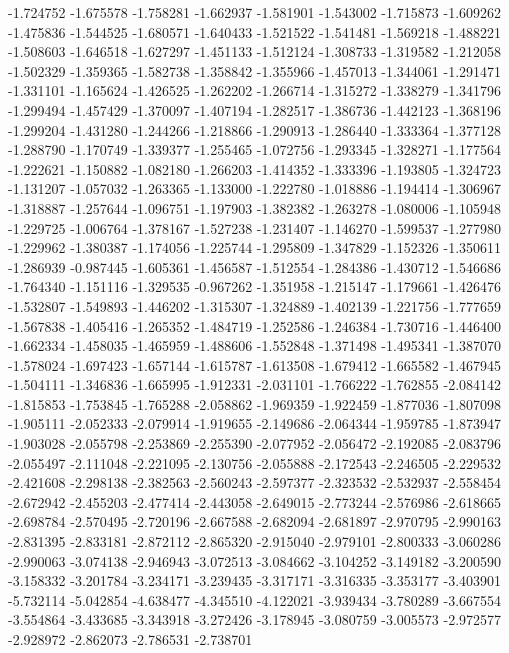 -1.724752
-1.675578
-1.758281
-1.662937
-1.581901
-1.543002
-1.715873
-1.609262
-1.475836
-1.544525
-1.680571
-1.640433
-1.521522
-1.541481
-1.569218
-1.488221
-1.508603
-1.646518
-1.627297
-1.451133
-1.512124
-1.308733
-1.319582
-1.212058
-1.502329
-1.359365
-1.582738
-1.358842
-1.355966
-1.457013
-1.344061
-1.291471
-1.331101
-1.165624
-1.426525
-1.262202
-1.266714
-1.315272
-1.338279
-1.341796
-1.299494
-1.457429
-1.370097
-1.407194
-1.282517
-1.386736
-1.442123
-1.368196
-1.299204
-1.431280
-1.244266
-1.218866
-1.290913
-1.286440
-1.333364
-1.377128
-1.288790
-1.170749
-1.339377
-1.255465
-1.072756
-1.293345
-1.328271
-1.177564
-1.222621
-1.150882
-1.082180
-1.266203
-1.414352
-1.333396
-1.193805
-1.324723
-1.131207
-1.057032
-1.263365
-1.133000
-1.222780
-1.018886
-1.194414
-1.306967
-1.318887
-1.257644
-1.096751
-1.197903
-1.382382
-1.263278
-1.080006
-1.105948
-1.229725
-1.006764
-1.378167
-1.527238
-1.231407
-1.146270
-1.599537
-1.277980
-1.229962
-1.380387
-1.174056
-1.225744
-1.295809
-1.347829
-1.152326
-1.350611
-1.286939
-0.987445
-1.605361
-1.456587
-1.512554
-1.284386
-1.430712
-1.546686
-1.764340
-1.151116
-1.329535
-0.967262
-1.351958
-1.215147
-1.179661
-1.426476
-1.532807
-1.549893
-1.446202
-1.315307
-1.324889
-1.402139
-1.221756
-1.777659
-1.567838
-1.405416
-1.265352
-1.484719
-1.252586
-1.246384
-1.730716
-1.446400
-1.662334
-1.458035
-1.465959
-1.488606
-1.552848
-1.371498
-1.495341
-1.387070
-1.578024
-1.697423
-1.657144
-1.615787
-1.613508
-1.679412
-1.665582
-1.467945
-1.504111
-1.346836
-1.665995
-1.912331
-2.031101
-1.766222
-1.762855
-2.084142
-1.815853
-1.753845
-1.765288
-2.058862
-1.969359
-1.922459
-1.877036
-1.807098
-1.905111
-2.052333
-2.079914
-1.919655
-2.149686
-2.064344
-1.959785
-1.873947
-1.903028
-2.055798
-2.253869
-2.255390
-2.077952
-2.056472
-2.192085
-2.083796
-2.055497
-2.111048
-2.221095
-2.130756
-2.055888
-2.172543
-2.246505
-2.229532
-2.421608
-2.298138
-2.382563
-2.560243
-2.597377
-2.323532
-2.532937
-2.558454
-2.672942
-2.455203
-2.477414
-2.443058
-2.649015
-2.773244
-2.576986
-2.618665
-2.698784
-2.570495
-2.720196
-2.667588
-2.682094
-2.681897
-2.970795
-2.990163
-2.831395
-2.833181
-2.872112
-2.865320
-2.915040
-2.979101
-2.800333
-3.060286
-2.990063
-3.074138
-2.946943
-3.072513
-3.084662
-3.104252
-3.149182
-3.200590
-3.158332
-3.201784
-3.234171
-3.239435
-3.317171
-3.316335
-3.353177
-3.403901
-5.732114
-5.042854
-4.638477
-4.345510
-4.122021
-3.939434
-3.780289
-3.667554
-3.554864
-3.433685
-3.343918
-3.272426
-3.178945
-3.080759
-3.005573
-2.972577
-2.928972
-2.862073
-2.786531
-2.738701
